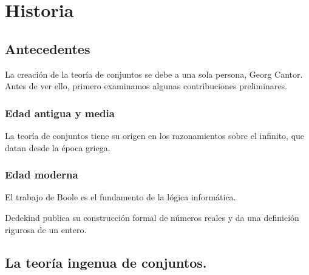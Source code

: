 \section{Historia} 

\subsection{Antecedentes}

\begin{frame}
	\begin{alertblock}{}
		\justify
		La creación de la teoría de conjuntos se debe a una sola persona, Georg Cantor. Antes de ver ello, primero examinamos algunas contribuciones preliminares.
	\end{alertblock}
\end{frame}

\begin{frame}
\frametitle{Edad antigua y media}
La teoría de conjuntos tiene su origen en los razonamientos sobre el infinito, que datan desde la época griega.\\

\startchronology
[startyear=-500, stopyear=1650]
%
\stopchronology
\end{frame}

\begin{frame}
\frametitle{Edad moderna}

El trabajo de Boole es el fundamento de la lógica informática.\\

\startchronology
[startyear=1840, stopyear=1880]


\stopchronology

Dedekind publica su construcción formal de números reales y da una definición rigurosa de un entero.
\end{frame}

\subsection{La teoría ingenua de conjuntos.}

